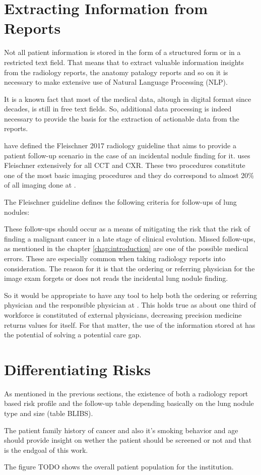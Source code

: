 \section{Extracting Information from Reports}

Not all patient information is stored in the form of a structured form or in a restricted text field. That means that to extract valuable information insights from the radiology reports, the anatomy patalogy reports and so on it is necessary to make extensive use of Natural Language Processing (NLP). %

It is a known  fact that most of the medical data, altough in digital format since decades, is still in free text fields. %
So, additional data processing is indeed necessary to provide the basis for the extraction of actionable data from the reports.

 have defined the Fleischner 2017 radiology guideline that aims to provide a patient follow-up scenario in the case of an incidental nodule finding for it. \nomeHsl{} uses Fleischner extensively for all CCT and CXR. These two procedures constitute one of the most basic imaging procedures and they do correspond to almost 20\% of all imaging done at \nomeHslShort{}. %

The Fleischner guideline defines the following criteria for follow-ups of lung nodules: %

These follow-ups should occur as a  means of mitigating the risk that the risk of finding a malignant cancer in a late stage of clinical evolution. Missed follow-ups, as mentioned in  the chapter \ref{chap:introduction} are one of the possible medical errors. These are especially common when taking radiology reports into consideration. The reason for it is that the ordering or referring physician for the image exam forgets or does not reads the incidental lung nodule finding. 

So it would be appropriate to have any tool to help both the ordering or referring physician and the responsible physician at \nomeHsl{}. This holds true as about one third of \nomeHslShort{} workforce is constituted of external physicians, decreasing precision medicine returns values for itself. For that matter, the use of the information stored at \nomeHslShort{} has the potential of solving a potential care gap. 

\section{Differentiating Risks}

As mentioned in the previous sections, the existence of both a radiology report based risk profile and the follow-up table depending basically on the lung nodule type and  size (table BLIBS). 

The patient family history of cancer and also it's smoking behavior and age should provide insight on wether the patient should be screened or not and that is the endgoal of this work.

The figure TODO shows the overall patient population for the institution.
